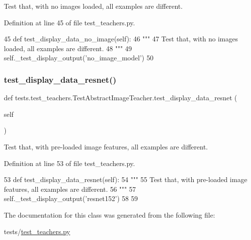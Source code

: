 \begin{DoxyVerb}Test that, with no images loaded, all examples are different.
\end{DoxyVerb}
 

Definition at line 45 of file test\+\_\+teachers.\+py.


\begin{DoxyCode}
45     \textcolor{keyword}{def }test\_display\_data\_no\_image(self):
46         \textcolor{stringliteral}{"""}
47 \textcolor{stringliteral}{        Test that, with no images loaded, all examples are different.}
48 \textcolor{stringliteral}{        """}
49         self.\_test\_display\_output(\textcolor{stringliteral}{'no\_image\_model'})
50 
\end{DoxyCode}
\mbox{\label{classtests_1_1test__teachers_1_1TestAbstractImageTeacher_a6b10fb441cd4f93aa4eceba77d659abf}} 
\subsubsection{\texorpdfstring{test\+\_\+display\+\_\+data\+\_\+resnet()}{test\_display\_data\_resnet()}}
{\footnotesize\ttfamily def tests.\+test\+\_\+teachers.\+Test\+Abstract\+Image\+Teacher.\+test\+\_\+display\+\_\+data\+\_\+resnet (\begin{DoxyParamCaption}\item[{}]{self }\end{DoxyParamCaption})}

\begin{DoxyVerb}Test that, with pre-loaded image features, all examples are different.
\end{DoxyVerb}
 

Definition at line 53 of file test\+\_\+teachers.\+py.


\begin{DoxyCode}
53     \textcolor{keyword}{def }test\_display\_data\_resnet(self):
54         \textcolor{stringliteral}{"""}
55 \textcolor{stringliteral}{        Test that, with pre-loaded image features, all examples are different.}
56 \textcolor{stringliteral}{        """}
57         self.\_test\_display\_output(\textcolor{stringliteral}{'resnet152'})
58 
59 
\end{DoxyCode}


The documentation for this class was generated from the following file\+:\begin{DoxyCompactItemize}
\item 
tests/\hyperlink{test__teachers_8py}{test\+\_\+teachers.\+py}\end{DoxyCompactItemize}
